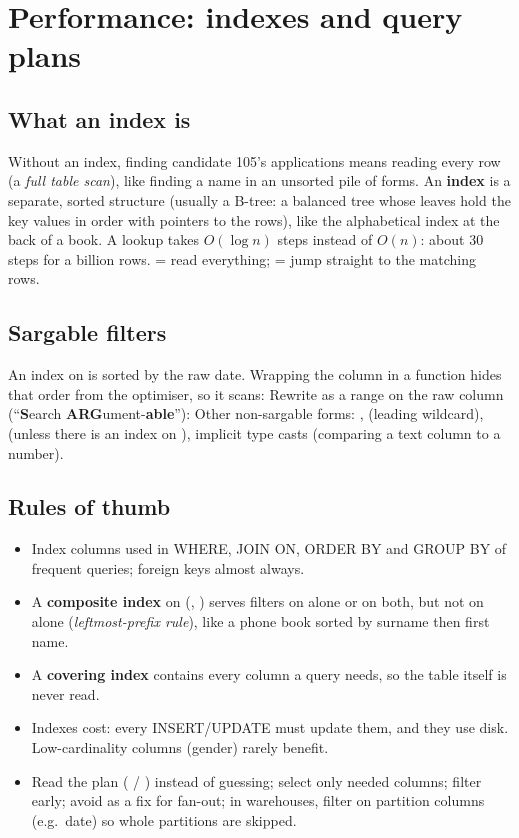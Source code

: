 \section{Performance: indexes and query plans}
\subsection{What an index is}
Without an index, finding candidate 105's applications means reading every row (a \emph{full table scan}), like finding a name in an unsorted pile of
forms. An \textbf{index} is a separate, sorted structure (usually a B-tree: a balanced tree whose leaves hold the key values in order with pointers to the
rows), like the alphabetical index at the back of a book. A lookup takes $O(\log n)$ steps instead of $O(n)$: about 30 steps for a billion rows.
 = read everything;  = jump straight to the matching rows.

\subsection{Sargable filters}
An index on  is sorted by the raw date. Wrapping the column in a function hides that order from the optimiser, so it scans:
Rewrite as a range on the raw column (``\textbf{S}earch \textbf{ARG}ument-\textbf{able}''):
Other non-sargable forms: ,  (leading wildcard),  (unless there is an index
on ), implicit type casts (comparing a text column to a number).

\subsection{Rules of thumb}
\begin{itemize}
\item Index columns used in WHERE, JOIN ON, ORDER BY and GROUP BY of frequent queries; foreign keys almost always.
\item A \textbf{composite index} on (, ) serves filters on  alone or on both, but not on
 alone (\emph{leftmost-prefix rule}), like a phone book sorted by surname then first name.
\item A \textbf{covering index} contains every column a query needs, so the table itself is never read.
\item Indexes cost: every INSERT/UPDATE must update them, and they use disk. Low-cardinality columns (gender) rarely benefit.
\item Read the plan ( / ) instead of guessing; select only needed columns; filter early; avoid 
as a fix for fan-out; in warehouses, filter on partition columns (e.g.\ date) so whole partitions are skipped.
\end{itemize}

